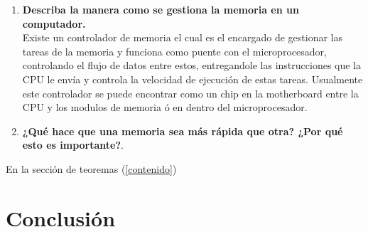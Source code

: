 \documentclass{article}
\begin{document}
\begin{enumerate}
\begin{enumerate}
    \end{enumerate}
    \item \textbf{Describa la manera como se gestiona la memoria en un computador.}\\
    Existe un controlador de memoria el cual es el encargado de gestionar las tareas de la memoria y funciona como puente con el microprocesador, controlando el flujo de datos entre estos, entregandole las instrucciones que la CPU le envía y controla la velocidad de ejecución de estas tareas. Usualmente este controlador se puede encontrar como un chip en la motherboard entre la CPU y los modulos de memoria ó en dentro del microprocesador. \cite{augusto}
    \item \textbf{¿Qué hace que una memoria sea más rápida que otra? ¿Por qué esto es importante?}.\\
    
\end{enumerate}

En la sección de teoremas (\ref{contenido})

\section{Conclusión} \label{conclusion}



\end{document}
